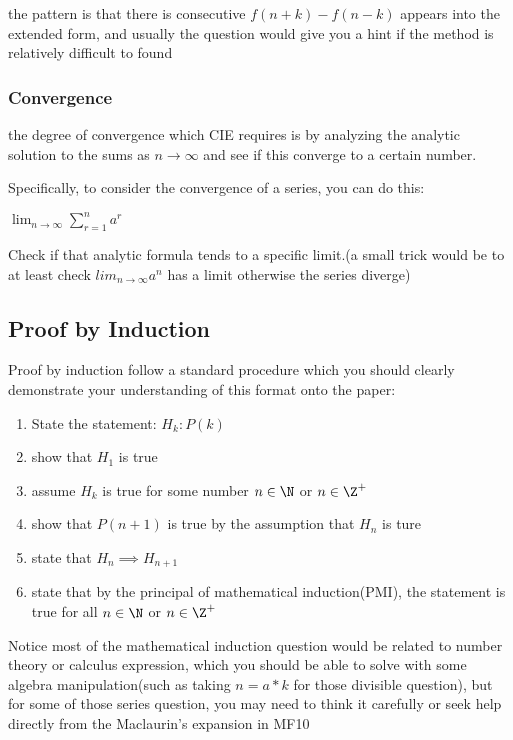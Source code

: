 \documentclass[]{article}
\begin{document}
the pattern is that there is consecutive \(f(n+k) - f(n-k)\) appears
into the extended form, and usually the question would give you a hint
if the method is relatively difficult to found

\subsubsection{Convergence}\label{header-n201}

the degree of convergence which CIE requires is by analyzing the
analytic solution to the sums as \(n \rightarrow \infty\) and see if
this converge to a certain number.

Specifically, to consider the convergence of a series, you can do this:

\(\lim_{n\rightarrow \infty} \sum^n_{r=1} a^r\)

Check if that analytic formula tends to a specific limit.(a small trick
would be to at least check \(lim_{n\rightarrow \infty} a^n\) has a limit
otherwise the series diverge)

\subsection{Proof by Induction}\label{header-n206}

Proof by induction follow a standard procedure which you should clearly
demonstrate your understanding of this format onto the paper:

\begin{enumerate}
\def\labelenumi{\arabic{enumi}.}
\item
  State the statement: \(H_k : P(k)\)
\item
  show that \(H_1\) is true
\item
  assume \(H_k\) is true for some number \(n\in \N\) or \(n \in \Z^+\)
\item
  show that \(P(n+1)\) is true by the assumption that \(H_n\) is ture
\item
  state that \(H_n \implies H_{n+1}\)
\item
  state that by the principal of mathematical induction(PMI), the
  statement is true for all \(n\in \N\) or \(n \in \Z^+\)
\end{enumerate}

Notice most of the mathematical induction question would be related to
number theory or calculus expression, which you should be able to solve
with some algebra manipulation(such as taking \(n = a*k\) for those
divisible question), but for some of those series question, you may need
to think it carefully or seek help directly from the Maclaurin's
expansion in MF10
\end{document}
